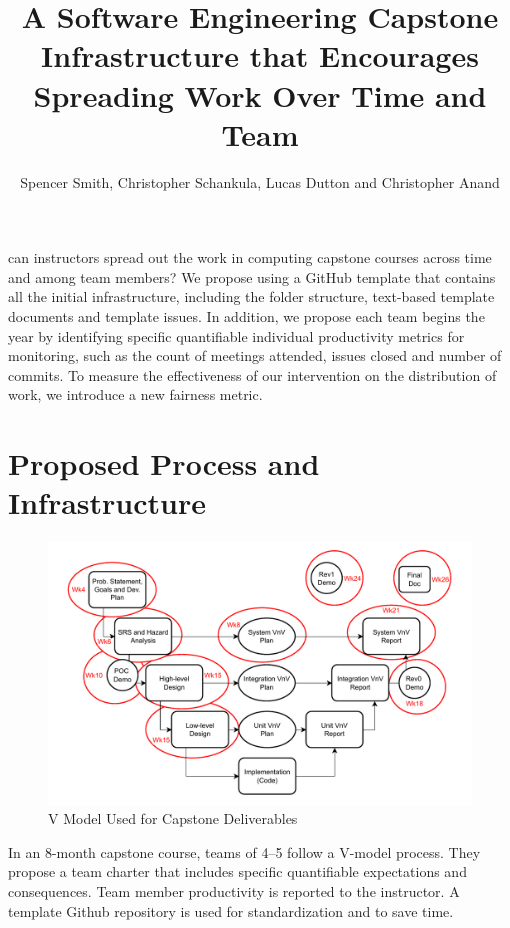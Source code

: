 \documentclass[poster, a1, plainboxedsections]{sciposter}
\title{A Software Engineering Capstone Infrastructure that Encourages Spreading
Work Over Time and Team}
\author{Spencer Smith, Christopher Schankula, Lucas Dutton and Christopher Anand}
\institute{Computing and Software Department, McMaster University}
\begin{document}

\maketitle

\setlength{\columnseprule}{0pt}
\begin{multicols}{2}

 can instructors spread out the work in computing capstone
courses across time and among team members? We propose using a GitHub template
that contains all the initial infrastructure, including the folder structure,
text-based template documents and template issues. In addition, we propose each
team begins the year by identifying specific quantifiable individual
productivity metrics for monitoring, such as the count of meetings attended,
issues closed and number of commits. To measure the effectiveness of our
intervention on the distribution of work, we introduce a new fairness metric.

\section{Proposed Process and Infrastructure} \label{SecPropInfrastruc}

\begin{figure}[!h]
\includegraphics[width=1.0\linewidth]{../figures/CourseStructure.drawio.pdf}
\caption{\label{Fig_VModel} V Model Used for Capstone Deliverables}
\label{FigStructure}
\end{figure}

In an 8-month capstone course, teams of 4--5 follow a V-model process. They
propose a team charter that includes specific quantifiable expectations and
consequences. Team member productivity is reported to the instructor. A template
Github repository is used for standardization and to save time.  


\end{multicols}
\end{document}
